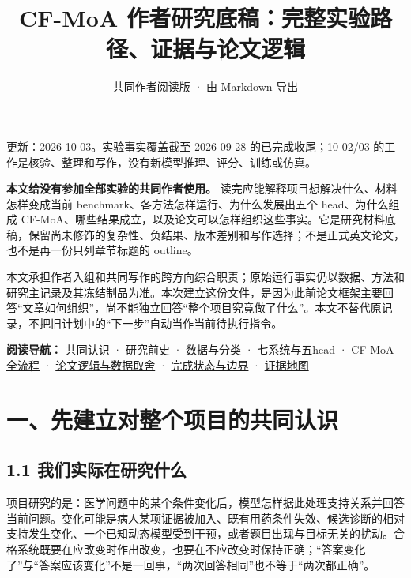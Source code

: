 \documentclass[
  11pt,
  a4paper,
]{article}
\title{CF-MoA 作者研究底稿：完整实验路径、证据与论文逻辑}
\subtitle{共同作者阅读版 · 由 Markdown 导出}
\author{}
\date{}
\renewcommand{\tableofcontents}{\clearpage\originaltableofcontents\clearpage}}
\begin{document}
\maketitle

\renewcommand*\contentsname{目录}
{
\setcounter{tocdepth}{2}
\tableofcontents
}
更新：2026-10-03。实验事实覆盖截至 2026-09-28 的已完成收尾；10-02/03
的工作是核验、整理和写作，没有新模型推理、评分、训练或仿真。

\textbf{本文给没有参加全部实验的共同作者使用。}
读完应能解释项目想解决什么、材料怎样变成当前
benchmark、各方法怎样运行、为什么发展出五个 head、为什么组成
CF-MoA、哪些结果成立，以及论文可以怎样组织这些事实。它是研究材料底稿，保留尚未修饰的复杂性、负结果、版本差别和写作选择；不是正式英文论文，也不是再一份只列章节标题的
outline。

本文承担作者入组和共同写作的跨方向综合职责；原始运行事实仍以数据、方法和研究主记录及其冻结制品为准。本次建立这份文件，是因为此前\href{https://github.com/xiotakut/cf_mrg/blob/main/papers/2026-10-02_cf_moa/framework/outline.zh.md}{论文框架}主要回答``文章如何组织''，尚不能独立回答``整个项目究竟做了什么''。本文不替代原记录，不把旧计划中的``下一步''自动当作当前待执行指令。

\textbf{阅读导航：} \hyperref[orientation]{共同认识} ·
\hyperref[early-history]{研究前史} ·
\hyperref[data-construction]{数据与分类} ·
\hyperref[heads-and-baselines]{七系统与五head} ·
\hyperref[cf-moa-path]{CF-MoA全流程} ·
\hyperref[author-logic]{论文逻辑与数据取舍} ·
\hyperref[current-status]{完成状态与边界} ·
\hyperref[evidence-map]{证据地图}

\label{orientation}

\section{一、先建立对整个项目的共同认识}\label{ux4e00ux5148ux5efaux7acbux5bf9ux6574ux4e2aux9879ux76eeux7684ux5171ux540cux8ba4ux8bc6}

\subsection{1.1
我们实际在研究什么}\label{ux6211ux4eecux5b9eux9645ux5728ux7814ux7a76ux4ec0ux4e48}

项目研究的是：医学问题中的某个条件变化后，模型怎样据此处理支持关系并回答当前问题。变化可能是病人某项证据被加入、既有用药条件失效、候选诊断的相对支持发生变化、一个已知动态模型受到干预，或者题目出现与目标无关的扰动。合格系统既要在应改变时作出改变，也要在不应改变时保持正确；``答案变化了''与``答案应该变化''不是一回事，``两次回答相同''也不等于``两次都正确''。
\end{document}
